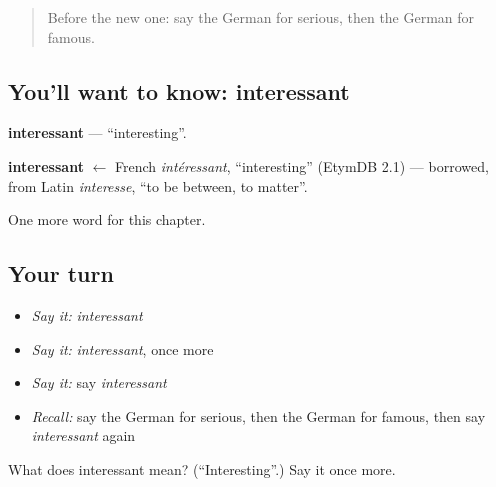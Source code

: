 \begin{quote}
Before the new one: say the German for serious, then the German for famous.
\end{quote}

\subsection*{You'll want to know: interessant}
\textbf{interessant} — \textquotedblleft{}interesting\textquotedblright{}.

\begin{cousinweb}
\textbf{interessant} $\leftarrow$ French \emph{intéressant}, \textquotedblleft{}interesting\textquotedblright{} (EtymDB 2.1) — borrowed, from Latin \emph{interesse}, \textquotedblleft{}to be between, to matter\textquotedblright{}.
\end{cousinweb}

\begin{grammarlens}[title={What you've built}]
One more word for this chapter.
\end{grammarlens}

\subsection*{Your turn}
\begin{itemize}
\raggedright
  \item \emph{Say it:} \emph{interessant}
  \item \emph{Say it:} \emph{interessant}, once more
  \item \emph{Say it:} say \emph{interessant}
  \item \emph{Recall:} say the German for serious, then the German for famous, then say \emph{interessant} again
\end{itemize}

\begin{tcolorbox}[breakable,colback=teal!4,colframe=teal!35!black,title={Before you move on}]
What does interessant mean? (\textquotedblleft{}Interesting\textquotedblright{}.) Say it once more.
\end{tcolorbox}
